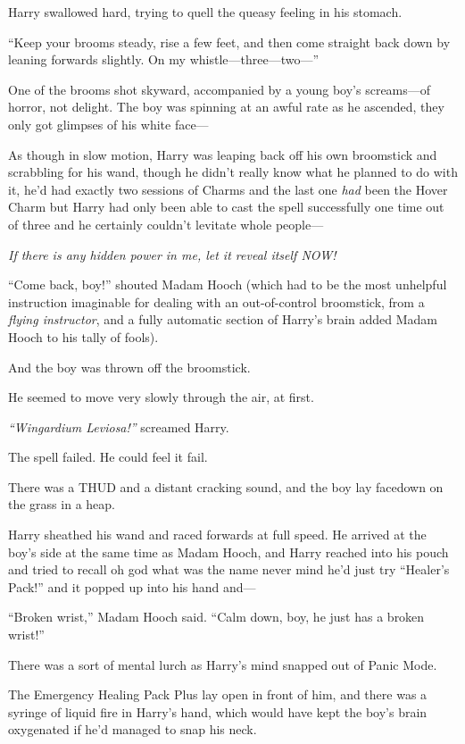 Harry swallowed hard, trying to quell the queasy feeling in his stomach.

``Keep your brooms steady, rise a few feet, and then come straight back
down by leaning forwards slightly. On my whistle---three---two---''

One of the brooms shot skyward, accompanied by a young boy's
screams---of horror, not delight. The boy was spinning at an awful rate
as he ascended, they only got glimpses of his white face---

As though in slow motion, Harry was leaping back off his own broomstick
and scrabbling for his wand, though he didn't really know what he
planned to do with it, he'd had exactly two sessions of Charms and the
last one \emph{had} been the Hover Charm but Harry had only been able to
cast the spell successfully one time out of three and he certainly
couldn't levitate whole people---

\emph{If there is any hidden power in me, let it reveal itself NOW!}

``Come back, boy!'' shouted Madam Hooch (which had to be the most
unhelpful instruction imaginable for dealing with an out-of-control
broomstick, from a \emph{flying instructor}, and a fully automatic
section of Harry's brain added Madam Hooch to his tally of fools).

And the boy was thrown off the broomstick.

He seemed to move very slowly through the air, at first.

\emph{``Wingardium Leviosa!''} screamed Harry.

The spell failed. He could feel it fail.

There was a THUD and a distant cracking sound, and the boy lay facedown
on the grass in a heap.

Harry sheathed his wand and raced forwards at full speed. He arrived at
the boy's side at the same time as Madam Hooch, and Harry reached into
his pouch and tried to recall oh god what was the name never mind he'd
just try ``Healer's Pack!'' and it popped up into his hand and---

``Broken wrist,'' Madam Hooch said. ``Calm down, boy, he just has a
broken wrist!''

There was a sort of mental lurch as Harry's mind snapped out of Panic
Mode.

The Emergency Healing Pack Plus lay open in front of him, and there was
a syringe of liquid fire in Harry's hand, which would have kept the
boy's brain oxygenated if he'd managed to snap his neck.

